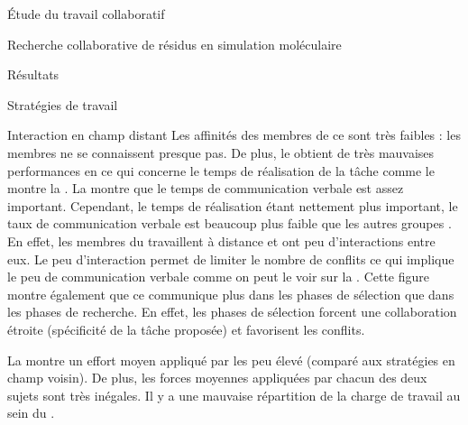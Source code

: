 \documentclass[myfrancais]{mythesis}
\begin{document}
\begin{mypart}{Étude du travail collaboratif}
\begin{mychapter}{Recherche collaborative de résidus en simulation moléculaire}
\begin{mysection}{Résultats}
\begin{mysubsection}{Stratégies de travail}
\begin{mysubsubsection}{Interaction en champ distant}
						Les affinités des membres de ce  sont très faibles  : les membres ne se connaissent presque pas.
						De plus, le  obtient de très mauvaises performances en ce qui concerne le temps de réalisation de la tâche comme le montre la .
						La  montre que le temps de communication verbale est assez important.
						Cependant, le temps de réalisation étant nettement plus important, le taux de communication verbale est beaucoup plus faible que les autres groupes .
						En effet, les membres du  travaillent à distance et ont peu d'interactions entre eux.
						Le peu d'interaction permet de limiter le nombre de conflits ce qui implique le peu de communication verbale comme on peut le voir sur la .
						Cette figure montre également que ce  communique plus dans les phases de sélection que dans les phases de recherche.
						En effet, les phases de sélection forcent une collaboration étroite (spécificité de la tâche proposée) et favorisent les conflits.

						La  montre un effort moyen appliqué par les  peu élevé (comparé aux stratégies en champ voisin).
						De plus, les forces moyennes appliquées par chacun des deux sujets sont très inégales.
						Il y a une mauvaise répartition de la charge de travail au sein du .


\end{mysubsubsection}
\end{mysubsection}
\end{mysection}
\end{mychapter}
\end{mypart}
\end{document}
